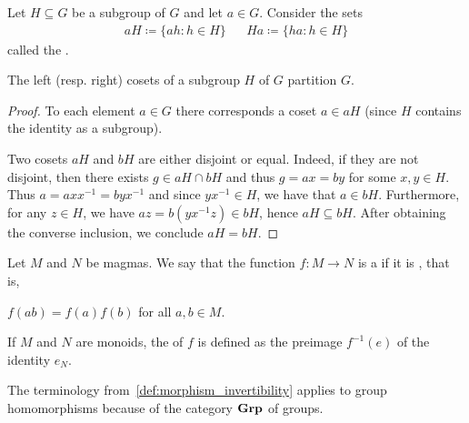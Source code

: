 \begin{definition}\label{def:group_cosets}
  Let \( H \subseteq G \) be a subgroup of \( G \) and let \( a \in G \). Consider the sets
  \begin{align*}
    aH \coloneqq \{ ah \colon h \in H \}
    &&
    Ha \coloneqq \{ ha \colon h \in H \}
  \end{align*}
  called the .
\end{definition}

\begin{proposition}\label{thm:coset_partition}
  The left (resp. right) cosets of a subgroup \( H \) of \( G \) partition \( G \).
\end{proposition}
\begin{proof}
  To each element \( a \in G \) there corresponds a coset \( a \in aH \) (since \( H \) contains the identity as a subgroup).

  Two cosets \( aH \) and \( bH \) are either disjoint or equal. Indeed, if they are not disjoint, then there exists \( g \in aH \cap bH \) and thus \( g = ax = by \) for some \( x, y \in H \). Thus \( a = a x x^{-1} = b y x^{-1} \) and since \( y x^{-1} \in H \), we have that \( a \in bH \). Furthermore, for any \( z \in H \), we have \( az = b(y x^{-1} z) \in bH \), hence \( aH \subseteq bH \). After obtaining the converse inclusion, we conclude \( aH = bH \).
\end{proof}

\begin{definition}\label{def:group_homomorphism}
  Let \( M \) and \( N \) be magmas. We say that the function \( f: M \to N \) is a  if it is , that is,
  \begin{description}
     \( f(ab) = f(a) f(b) \) for all \( a, b \in M \).
  \end{description}

  If \( M \) and \( N \) are monoids, the  of \( f \) is defined as the preimage \( f^{-1}(e) \) of the identity \( e_N \).

  The terminology from~\cref{def:morphism_invertibility} applies to group homomorphisms because of the category \( \operatorname{\mathbf{Grp}} \) of groups.
\end{definition}

